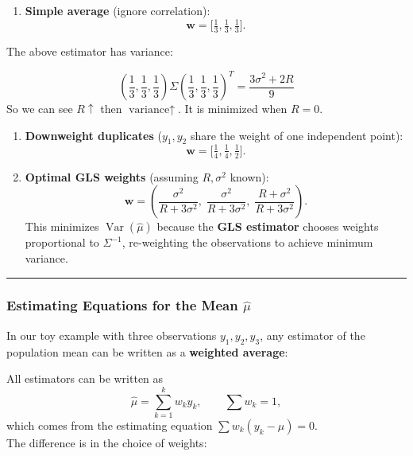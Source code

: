 \documentclass[
  letterpaper,
  DIV=11,
  numbers=noendperiod]{scrreprt}
\providecommand{\tightlist}{%
  \setlength{\itemsep}{0pt}\setlength{\parskip}{0pt}}\usepackage{longtable,booktabs,array}
\begin{document}
\begin{enumerate}
\def\labelenumi{\arabic{enumi}.}
\tightlist
\item
  \textbf{Simple average} (ignore correlation): \[
  \mathbf{w} = \Big[\tfrac{1}{3}, \tfrac{1}{3}, \tfrac{1}{3}\Big].
  \]
\end{enumerate}

The above estimator has variance:

\[
\left(\frac{1}{3},\frac{1}{3}, \frac{1}{3}\right)\Sigma\left(\frac{1}{3},\frac{1}{3}, \frac{1}{3}\right)^T = \frac{3\sigma^2 + 2R}{9}
\] So we can see \(R \uparrow\) then \(\text{variance} \uparrow\). It is
minimized when \(R=0\).

\begin{enumerate}
\def\labelenumi{\arabic{enumi}.}
\setcounter{enumi}{1}
\item
  \textbf{Downweight duplicates} (\(y_1,y_2\) share the weight of one
  independent point): \[
  \mathbf{w} = \Big[\tfrac{1}{4}, \tfrac{1}{4}, \tfrac{1}{2}\Big].
  \]
\item
  \textbf{Optimal GLS weights} (assuming \(R,\sigma^2\) known): \[
  \mathbf{w} =
  \left(\frac{\sigma^2}{R+3\sigma^2},\;
        \frac{\sigma^2}{R+3\sigma^2},\;
        \frac{R+\sigma^2}{R+3\sigma^2}\right).
  \] This minimizes \(\operatorname{Var}(\hat\mu)\) because the
  \textbf{GLS estimator} chooses weights proportional to
  \(\Sigma^{-1}\), re-weighting the observations to achieve minimum
  variance.
\end{enumerate}

\begin{center}\rule{0.5\linewidth}{0.5pt}\end{center}

\hypertarget{estimating-equations-for-the-mean-hatmu}{%
\subsubsection*{\texorpdfstring{Estimating Equations for the Mean
\(\hat{\mu}\)}{Estimating Equations for the Mean \textbackslash hat\{\textbackslash mu\}}}\label{estimating-equations-for-the-mean-hatmu}}

In our toy example with three observations \(y_1,y_2,y_3\), any
estimator of the population mean can be written as a \textbf{weighted
average}:

All estimators can be written as \[
\hat\mu = \sum_{k=1}^k w_k y_k, \qquad \sum w_k=1,
\] which comes from the estimating equation \(\sum w_k(y_k-\mu)=0\).\\
The difference is in the choice of weights:
\end{document}
